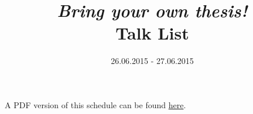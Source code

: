 \documentclass[12pt, a4paper, english]{article}
\title{\emph{Bring your own thesis!} \\ Talk List}
\date{26.06.2015 - 27.06.2015}
\begin{document}
\maketitle

A PDF version of this schedule can be found \href{schedule.pdf}{here}.


\end{document}
